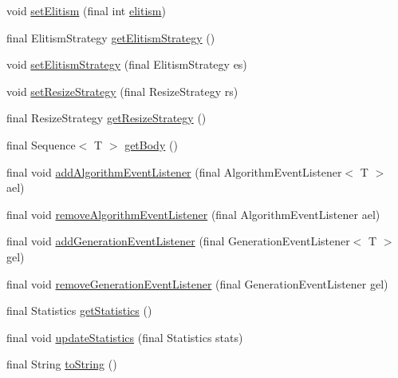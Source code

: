 \begin{DoxyCompactItemize}
\item 
void \hyperlink{classjenes_1_1_genetic_algorithm_3_01_t_01extends_01_chromosome_01_4_a27f67506714b18eb15d890bfa3d5b0ab}{set\-Elitism} (final int \hyperlink{classjenes_1_1_genetic_algorithm_3_01_t_01extends_01_chromosome_01_4_ac4280b01e7da0ddc049050b19e28b8b9}{elitism})
\item 
final Elitism\-Strategy \hyperlink{classjenes_1_1_genetic_algorithm_3_01_t_01extends_01_chromosome_01_4_ad227ba9924206ee18f69d24ea4ee4ab0}{get\-Elitism\-Strategy} ()
\item 
void \hyperlink{classjenes_1_1_genetic_algorithm_3_01_t_01extends_01_chromosome_01_4_aedc89ba915f6a528ef4052eb31a8c467}{set\-Elitism\-Strategy} (final Elitism\-Strategy es)
\item 
void \hyperlink{classjenes_1_1_genetic_algorithm_3_01_t_01extends_01_chromosome_01_4_a685af9b6322920d9431977fd25c5cf77}{set\-Resize\-Strategy} (final Resize\-Strategy rs)
\item 
final Resize\-Strategy \hyperlink{classjenes_1_1_genetic_algorithm_3_01_t_01extends_01_chromosome_01_4_a379c5a3789ba72941a081d32fbcc4474}{get\-Resize\-Strategy} ()
\item 
final Sequence$<$ T $>$ \hyperlink{classjenes_1_1_genetic_algorithm_3_01_t_01extends_01_chromosome_01_4_aeab54a329fb6df5686a2fce4a8a8727a}{get\-Body} ()
\item 
final void \hyperlink{classjenes_1_1_genetic_algorithm_3_01_t_01extends_01_chromosome_01_4_a168e2b37b5351108e62d8fb887e1fae4}{add\-Algorithm\-Event\-Listener} (final Algorithm\-Event\-Listener$<$ T $>$ ael)
\item 
final void \hyperlink{classjenes_1_1_genetic_algorithm_3_01_t_01extends_01_chromosome_01_4_a8cab61e04f54ed5abbda047815a1683d}{remove\-Algorithm\-Event\-Listener} (final Algorithm\-Event\-Listener ael)
\item 
final void \hyperlink{classjenes_1_1_genetic_algorithm_3_01_t_01extends_01_chromosome_01_4_aa39f1ae905e67a5a3f7d7ad5cb25d276}{add\-Generation\-Event\-Listener} (final Generation\-Event\-Listener$<$ T $>$ gel)
\item 
final void \hyperlink{classjenes_1_1_genetic_algorithm_3_01_t_01extends_01_chromosome_01_4_a33e632148218289d0bc43e202a804bf1}{remove\-Generation\-Event\-Listener} (final Generation\-Event\-Listener gel)
\item 
final Statistics \hyperlink{classjenes_1_1_genetic_algorithm_3_01_t_01extends_01_chromosome_01_4_a484fcdba7cf2e4aa4a6ec1c0006e2193}{get\-Statistics} ()
\item 
final void \hyperlink{classjenes_1_1_genetic_algorithm_3_01_t_01extends_01_chromosome_01_4_a8a4f4965c968047c55a8b56240267a4f}{update\-Statistics} (final Statistics stats)
\item 
final String \hyperlink{classjenes_1_1_genetic_algorithm_3_01_t_01extends_01_chromosome_01_4_af847a2a8cba2288fbddf726ec12eaf47}{to\-String} ()
\end{DoxyCompactItemize}
